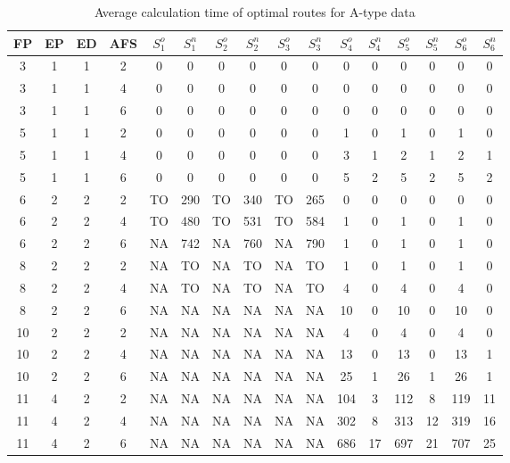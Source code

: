 \begin{longtable}{|c|c|c|c|c c|c c|c c|c c|c c|c c|}
\caption{Average calculation time of optimal routes for A-type data}
\label{tab:avg_time_a} \\
\hline
 FP & EP & ED & AFS & $S^o_1$ & $S^n_1$ & $S^o_2$ & $S^n_2$ & $S^o_3$ & $S^n_3$ & $S^o_4$ & $S^n_4$ & $S^o_5$ & $S^n_5$ & $S^o_6$ & $S^n_6$ \\
\hline\hline
3 & 1 & 1 & 2 & 0 & 0 & 0 & 0 & 0 & 0 & 0 & 0 & 0 & 0 & 0 & 0 \\
\hline
3 & 1 & 1 & 4 & 0 & 0 & 0 & 0 & 0 & 0 & 0 & 0 & 0 & 0 & 0 & 0 \\
\hline
3 & 1 & 1 & 6 & 0 & 0 & 0 & 0 & 0 & 0 & 0 & 0 & 0 & 0 & 0 & 0 \\
\hline
5 & 1 & 1 & 2 & 0 & 0 & 0 & 0 & 0 & 0 & 1 & 0 & 1 & 0 & 1 & 0 \\
\hline
5 & 1 & 1 & 4 & 0 & 0 & 0 & 0 & 0 & 0 & 3 & 1 & 2 & 1 & 2 & 1 \\
\hline
5 & 1 & 1 & 6 & 0 & 0 & 0 & 0 & 0 & 0 & 5 & 2 & 5 & 2 & 5 & 2 \\
\hline
6 & 2 & 2 & 2 & TO & 290 & TO & 340 & TO & 265 & 0 & 0 & 0 & 0 & 0 & 0 \\
\hline
6 & 2 & 2 & 4 & TO & 480 & TO & 531 & TO & 584 & 1 & 0 & 1 & 0 & 1 & 0 \\
\hline
6 & 2 & 2 & 6 & NA & 742 & NA & 760 & NA & 790 & 1 & 0 & 1 & 0 & 1 & 0 \\
\hline
8 & 2 & 2 & 2 & NA & TO & NA & TO & NA & TO & 1 & 0 & 1 & 0 & 1 & 0 \\
\hline
8 & 2 & 2 & 4 & NA & TO & NA & TO & NA & TO & 4 & 0 & 4 & 0 & 4 & 0 \\
\hline
8 & 2 & 2 & 6 & NA & NA & NA & NA & NA & NA & 10 & 0 & 10 & 0 & 10 & 0 \\
\hline
10 & 2 & 2 & 2 & NA & NA & NA & NA & NA & NA & 4 & 0 & 4 & 0 & 4 & 0 \\
\hline
10 & 2 & 2 & 4 & NA & NA & NA & NA & NA & NA & 13 & 0 & 13 & 0 & 13 & 1 \\
\hline
10 & 2 & 2 & 6 & NA & NA & NA & NA & NA & NA & 25 & 1 & 26 & 1 & 26 & 1 \\
\hline
11 & 4 & 2 & 2 & NA & NA & NA & NA & NA & NA & 104 & 3 & 112 & 8 & 119 & 11 \\
\hline
11 & 4 & 2 & 4 & NA & NA & NA & NA & NA & NA & 302 & 8 & 313 & 12 & 319 & 16 \\
\hline
11 & 4 & 2 & 6 & NA & NA & NA & NA & NA & NA & 686 & 17 & 697 & 21 & 707 & 25 \\
\hline
\end{longtable}